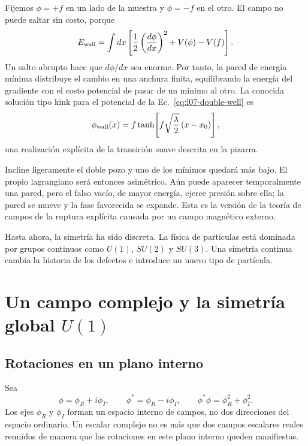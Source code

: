 Fijemos \(\phi=+f\) en un lado de la muestra y \(\phi=-f\) en el otro. El campo no puede saltar sin costo, porque
\begin{equation}
  E_{\rm wall}
  =\int dx\left[
      \frac12\left(\frac{d\phi}{dx}\right)^2+V(\phi)-V(f)
    \right].
  \label{eq:l07-wall-energy}
\end{equation}
Un salto abrupto hace que \(d\phi/dx\) sea enorme. Por tanto, la pared de energía mínima distribuye el cambio en una anchura finita, equilibrando la energía del gradiente con el costo potencial de pasar de un mínimo al otro. La conocida solución tipo kink para el potencial de la Ec.~\eqref{eq:l07-double-well} es
\begin{equation}
  \phi_{\rm wall}(x)
  =f\tanh\!\left[f\sqrt{\frac{\lambda}{2}}\,(x-x_0)\right],
  \label{eq:l07-kink}
\end{equation}
una realización explícita de la transición suave descrita en la pizarra.

Incline ligeramente el doble pozo y uno de los mínimos quedará más bajo. El propio lagrangiano será entonces asimétrico. Aún puede aparecer temporalmente una pared, pero el falso vacío, de mayor energía, ejerce presión sobre ella; la pared se mueve y la fase favorecida se expande. Esta es la versión de la teoría de campos de la ruptura explícita causada por un campo magnético externo.

Hasta ahora, la simetría ha sido discreta. La física de partículas está dominada por grupos continuos como \(U(1)\), \(SU(2)\) y \(SU(3)\). Una simetría continua cambia la historia de los defectos e introduce un nuevo tipo de partícula.

\section{Un campo complejo y la simetría global \texorpdfstring{\(U(1)\)}{U(1)}}

\subsection{Rotaciones en un plano interno}

Sea
\begin{equation}
  \phi=\phi_R+i\phi_I,
  \qquad
  \phi^*=\phi_R-i\phi_I,
  \qquad
  \phi^*\phi=\phi_R^2+\phi_I^2.
  \label{eq:l07-components}
\end{equation}
Los ejes \(\phi_R\) y \(\phi_I\) forman un espacio interno de campos, no dos direcciones del espacio ordinario. Un escalar complejo no es más que dos campos escalares reales reunidos de manera que las rotaciones en este plano interno queden manifiestas.

